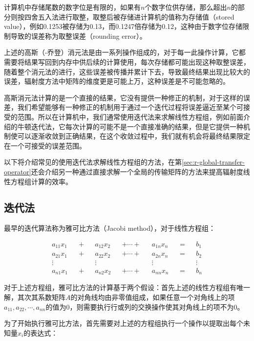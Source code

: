 计算机中存储尾数的数字位是有限的，如果有$n$个数字位供存储，那么超出$n$的部分则按四舍五入法进行取整，取整后被存储进计算机的值称为存储值（stored value），例如0.1253被存储为0.13，而0.1247倍存储为0.12，这种由于数字位存储限制导致的误差称为取整误差（rounding error）。

上述的高斯（-乔登）消元法是由一系列操作组成的，对于每一此操作计算，它都需要将结果写回到内存中供后续的计算使用，每次存储都可能出现这种取整误差，随着整个消元法的进行，这些误差被传播并累计下去，导致最终结果出现比较大的误差，辐射度方法中矩阵的维度更是可能上万，这种误差是不可能忽略的。

高斯消元法计算的是一个直接的结果，它没有提供一种修正的机制，对于这样的误差，我们希望能够有一种修正的机制用于通过一个迭代过程将误差逼近至某个可接受的范围。所以在计算机中，我们通常使用迭代法来求解线性方程组，例如前面介绍的牛顿迭代法，它每次计算的可能不是一个直接准确的结果，但是它提供一种机制使可以逐渐收敛到正确结果，在这个收敛过程中，我们就有机会将最终结果限定在一个可接受的误差范围。

以下将介绍常见的使用迭代法求解线性方程组的方法，在第\ref{sec:r-global-transfer-operator}还会介绍另一种通过直接求解一个全局的传输矩阵的方法来提高辐射度线性方程组计算的效率。




\subsection{迭代法}\label{sec:r-iteration}
最早的迭代算法称为雅可比方法（Jacobi method），对于线性方程组：

\begin{equation}
\begin{aligned}
	a_{11}x_1  &&+&&  a_{12}x_2 && +\cdots + && a_{1n}x_n &&=&& b_1\\
	a_{21}x_1  &&+&&  a_{22}x_2 && +\cdots + && a_{2n}x_n &&=&& b_2\\
	\vdots     && &&  \vdots    &&           && \vdots    && && \vdots\\
	a_{n1}x_1  &&+&&  a_{n2}x_2 && +\cdots + && a_{nn}x_n &&=&& b_n
\end{aligned}
\end{equation}

\noindent 对于上述方程组，雅可比方法的计算基于两个假设：首先上述的线性方程组有唯一解，其次其系数矩阵$A$的对角线均由非零值组成，如果任意一个对角线上的项$a_{11},a_{22},\cdots,a_{nn}$的值为0，则需要执行行或列的交换操作使其对角线上的项不为0。

为了开始执行雅可比方法，首先需要对上述的方程组执行一个操作以提取出每个未知量$x_i$的表达式：

